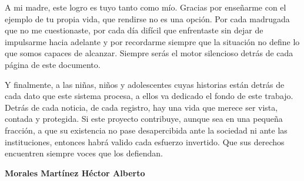 \documentclass[12pt,openany,oneside]{book}
\begin{document}
\vspace{0.6cm}

\noindent
A mi madre, este logro es tuyo tanto como mío.
Gracias por enseñarme con el ejemplo de tu propia vida, que rendirse no es una opción.
Por cada madrugada que no me cuestionaste, por cada día difícil que enfrentaste
sin dejar de impulsarme hacia adelante y por recordarme siempre que la situación
no define lo que somos capaces de alcanzar. Siempre serás el motor silencioso
detrás de cada página de este documento.

\vspace{0.6cm}

\noindent
Y finalmente, a las niñas, niños y adolescentes cuyas historias están detrás de cada
dato que este sistema procesa, a ellos va dedicado el fondo de este trabajo.
Detrás de cada noticia, de cada registro, hay una vida que merece ser vista,
contada y protegida.
Si este proyecto contribuye, aunque sea en una pequeña fracción,
a que su existencia no pase desapercibida ante la sociedad ni ante las instituciones,
entonces habrá valido cada esfuerzo invertido.
Que sus derechos encuentren siempre voces que los defiendan.

\vspace{1.5cm}
\begin{flushright}
    \textbf{Morales Martínez Héctor Alberto}
\end{flushright} 



\tableofcontents
\newpage
{}
\setcounter{page}{1}


\end{document}

